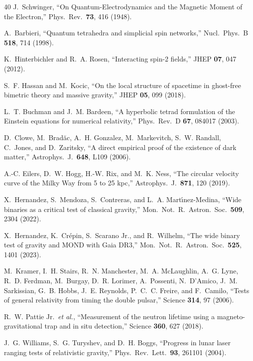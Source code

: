 \documentclass[aps,prd,preprint,superscriptaddress,showpacs,preprintnumbers,amsmath,amssymb,nofootinbib]{revtex4-2}
\begin{document}
\begin{thebibliography}{40}
J.~Schwinger, ``On Quantum-Electrodynamics and the Magnetic Moment of the Electron,'' Phys.\ Rev.\ \textbf{73}, 416 (1948).

A.~Barbieri, ``Quantum tetrahedra and simplicial spin networks,'' Nucl.\ Phys.\ B \textbf{518}, 714 (1998).

K.~Hinterbichler and R.~A. Rosen, ``Interacting spin-2 fields,'' JHEP \textbf{07}, 047 (2012).

S.~F. Hassan and M.~Kocic, ``On the local structure of spacetime in ghost-free bimetric theory and massive gravity,'' JHEP \textbf{05}, 099 (2018).

L.~T. Buchman and J.~M. Bardeen, ``A hyperbolic tetrad formulation of the Einstein equations for numerical relativity,'' Phys.\ Rev.\ D \textbf{67}, 084017 (2003).

D.~Clowe, M.~Brad\u{a}c, A.~H. Gonzalez, M.~Markevitch, S.~W. Randall, C.~Jones, and D.~Zaritsky, ``A direct empirical proof of the existence of dark matter,'' Astrophys.\ J.\ \textbf{648}, L109 (2006).

A.-C. Eilers, D.~W. Hogg, H.-W. Rix, and M.~K. Ness, ``The circular velocity curve of the Milky Way from 5 to 25 kpc,'' Astrophys.\ J.\ \textbf{871}, 120 (2019).

X.~Hernandez, S.~Mendoza, S.~Contreras, and L.~A. Mart\'{\i}nez-Medina, ``Wide binaries as a critical test of classical gravity,'' Mon.\ Not.\ R.\ Astron.\ Soc.\ \textbf{509}, 2304 (2022).

X.~Hernandez, K.~Cr\'epin, S.~Scarano Jr., and R.~Wilhelm, ``The wide binary test of gravity and MOND with Gaia DR3,'' Mon.\ Not.\ R.\ Astron.\ Soc.\ \textbf{525}, 1401 (2023).

M.~Kramer, I.~H. Stairs, R.~N. Manchester, M.~A. McLaughlin, A.~G. Lyne, R.~D. Ferdman, M.~Burgay, D.~R. Lorimer, A.~Possenti, N.~D'Amico, J.~M. Sarkissian, G.~B. Hobbs, J.~E. Reynolds, P.~C.~C. Freire, and F.~Camilo, ``Tests of general relativity from timing the double pulsar,'' Science \textbf{314}, 97 (2006).

R.~W. Pattie Jr.\ \textit{et al.}, ``Measurement of the neutron lifetime using a magneto-gravitational trap and in situ detection,'' Science \textbf{360}, 627 (2018).

J.~G. Williams, S.~G. Turyshev, and D.~H. Boggs, ``Progress in lunar laser ranging tests of relativistic gravity,'' Phys.\ Rev.\ Lett.\ \textbf{93}, 261101 (2004).


\end{thebibliography}
\end{document}
